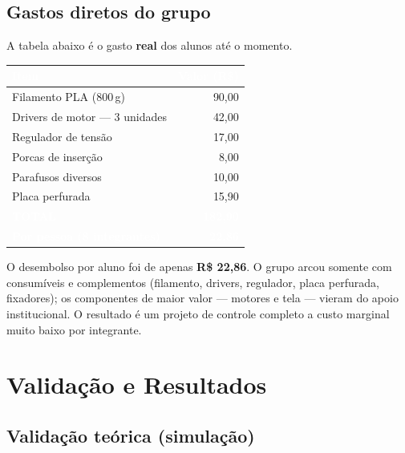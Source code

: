 \documentclass[11pt,a4paper,oneside]{article}
\newcommand{\rowstyle}{\rowcolor{rowgray}}
\begin{document}
\subsection{Gastos diretos do grupo}

A tabela abaixo é o gasto \textbf{real} dos alunos até o momento.

\begin{center}
\renewcommand{\arraystretch}{1.3}
\begin{tabular}{>{\RaggedRight\arraybackslash}p{8cm} r}
\toprule
\rowcolor{primary}
\textcolor{white}{\bfseries Item} & \textcolor{white}{\bfseries Valor (R\$)} \\
\midrule
Filamento PLA (800\,g) & 90,00 \\
\rowstyle Drivers de motor — 3 unidades & 42,00 \\
Regulador de tensão & 17,00 \\
\rowstyle Porcas de inserção & 8,00 \\
Parafusos diversos & 10,00 \\
\rowstyle Placa perfurada & 15,90 \\
\midrule
\rowcolor{secondary}
\textcolor{white}{\bfseries TOTAL} & \textcolor{white}{\bfseries 182,90} \\
\midrule
\rowcolor{accent}
\textcolor{white}{\bfseries Por pessoa (8 integrantes)} & \textcolor{white}{\bfseries 22,86} \\
\bottomrule
\end{tabular}
\end{center}

\begin{infobox}
O desembolso por aluno foi de apenas \textbf{R\$ 22,86}. O grupo arcou somente
com consumíveis e complementos (filamento, drivers, regulador, placa perfurada,
fixadores); os componentes de maior valor — motores e tela — vieram do apoio
institucional. O resultado é um projeto de controle completo a custo marginal
muito baixo por integrante.
\end{infobox}

\section{Validação e Resultados}

\subsection{Validação teórica (simulação)}
\end{document}

